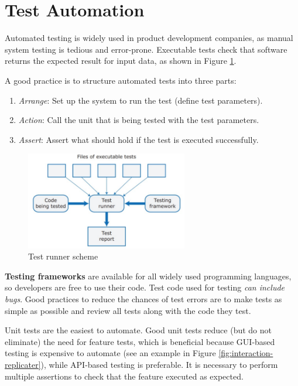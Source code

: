 \section{Test Automation}

Automated testing is widely used in product development companies, as manual system testing is tedious and error-prone. Executable tests check that software returns the expected result for input data, as shown in Figure \ref{fig:test-runner}.

\noindent A good practice is to structure automated tests into three parts:

\begin{enumerate}
    \item \textit{Arrange}: Set up the system to run the test (define test parameters).
    \item \textit{Action}: Call the unit that is being tested with the test parameters.
    \item \textit{Assert}: Assert what should hold if the test is executed successfully.
\end{enumerate}

\begin{figure} [H]
    \centering
    \includegraphics[width=0.63\textwidth]{images/Testing/test-runner.PNG}
    \caption{Test runner scheme}
    \label{fig:test-runner}
\end{figure} 

\textbf{Testing frameworks} are available for all widely used programming languages, so developers are free to use their code. Test code used for testing \emph{can include bugs}. Good practices to reduce the chances of test errors are to make tests as simple as possible and review all tests along with the code they test.

Unit tests are the easiest to automate. Good unit tests reduce (but do not eliminate) the need for feature tests, which is beneficial because GUI-based testing is expensive to automate (see an example in Figure \ref{fig:interaction-replicater}), while API-based testing is preferable. It is necessary to perform multiple assertions to check that the feature executed as expected.

